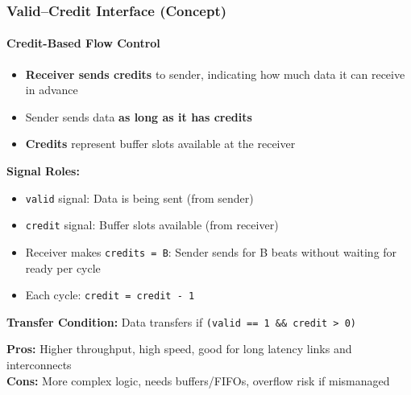\documentclass{beamer}
\begin{document}
\begin{frame}
\frametitle{Valid--Credit Interface (Concept)}
\framesubtitle{Credit-Based Flow Control}

\begin{itemize}
    \item \textbf{Receiver sends credits} to sender, indicating how much data it can receive in advance
    \item Sender sends data \textbf{as long as it has credits}
    \item \textbf{Credits} represent buffer slots available at the receiver
\end{itemize}

\vspace{0.3cm}
\textbf{Signal Roles:}
\begin{itemize}
    \item \texttt{valid} signal: Data is being sent (from sender)
    \item \texttt{credit} signal: Buffer slots available (from receiver)
    \item Receiver makes \texttt{credits = B}: Sender sends for B beats without waiting for ready per cycle
    \item Each cycle: \texttt{credit = credit - 1}
\end{itemize}

\vspace{0.3cm}
\textbf{Transfer Condition:} Data transfers if \texttt{(valid == 1 \&\& credit > 0)}

\vspace{0.3cm}
\textbf{Pros:} Higher throughput, high speed, good for long latency links and interconnects \\
\textbf{Cons:} More complex logic, needs buffers/FIFOs, overflow risk if mismanaged

\end{frame}
\end{document}
